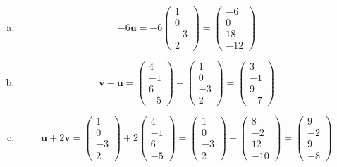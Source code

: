 \documentclass[11pt,letterpaper]{article}
\begin{document}
\sol 
\begin{enumerate}[(a)]
\item 
	\[
	-6 \mathbf{u}= -6 \begin{pmatrix} 1 \\ 0 \\ -3 \\ 2 \end{pmatrix}= \begin{pmatrix} -6 \\ 0 \\ 18 \\ -12 \end{pmatrix}
	\]

\item 
	\[
	\mathbf{v} - \mathbf{u}= \begin{pmatrix} 4 \\ -1 \\ 6 \\ -5 \end{pmatrix} - \begin{pmatrix} 1 \\ 0 \\ -3 \\ 2 \end{pmatrix}= \begin{pmatrix} 3 \\ -1 \\ 9 \\ -7 \end{pmatrix}
	\]

\item 
	\[
	\mathbf{u} + 2 \mathbf{v}=  \begin{pmatrix} 1 \\ 0 \\ -3 \\ 2 \end{pmatrix} + 2 \begin{pmatrix} 4 \\ -1 \\ 6 \\ -5 \end{pmatrix}=  \begin{pmatrix} 1 \\ 0 \\ -3 \\ 2 \end{pmatrix} + \begin{pmatrix} 8 \\ -2 \\ 12 \\ -10 \end{pmatrix}= \begin{pmatrix} 9 \\ -2 \\ 9 \\ -8 \end{pmatrix}
	\]


\end{enumerate}
\end{document}
